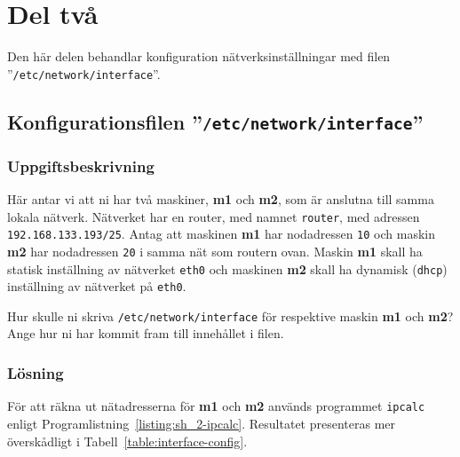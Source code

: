 %
%
%


\section{Del två}
Den här delen behandlar konfiguration nätverksinställningar med filen
''\texttt{/etc/network/interface}''.


\subsection{Konfigurationsfilen ''\texttt{/etc/network/interface}''}
\subsubsection{Uppgiftsbeskrivning}
Här antar vi att ni har två maskiner, \textbf{m1} och \textbf{m2}, som är
anslutna till samma lokala nätverk.  Nätverket har en router, med namnet
\texttt{router}, med adressen \texttt{192.168.133.193/25}. Antag att maskinen
\textbf{m1} har nodadressen \texttt{10} och maskin \textbf{m2} har nodadressen
\texttt{20} i samma nät som routern ovan. Maskin \textbf{m1} skall ha statisk
inställning av nätverket \texttt{eth0} och maskinen \textbf{m2} skall ha
dynamisk (\texttt{dhcp}) inställning av nätverket på \texttt{eth0}.

Hur skulle ni skriva \texttt{/etc/network/interface} för respektive maskin
\textbf{m1} och \textbf{m2}?  Ange hur ni har kommit fram till innehållet i
filen.


\subsubsection{Lösning}
För att räkna ut nätadresserna för \textbf{m1} och \textbf{m2} används programmet
\texttt{ipcalc} enligt Programlistning~\ref{listing:sh_2-ipcalc}.
Resultatet presenteras mer överskådligt i Tabell~\ref{table:interface-config}.


